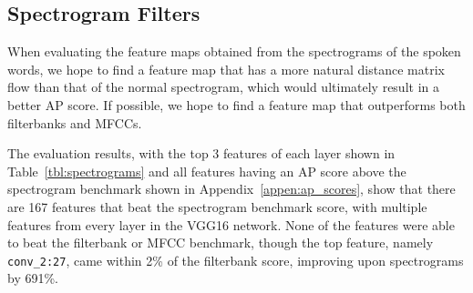 \subsection{Spectrogram Filters}

When evaluating the feature maps obtained from the spectrograms of the spoken words, we hope to find a feature map that has a more natural distance matrix flow than that of the normal spectrogram, which would ultimately result in a better AP score.
If possible, we hope to find a feature map that outperforms both filterbanks and MFCCs.

The evaluation results, with the top 3 features of each layer shown in Table~\ref{tbl:spectrograms} and all features having an AP score above the spectrogram benchmark shown in Appendix~\ref{appen:ap_scores}, show that there are 167 features that beat the spectrogram benchmark score, with multiple features from every layer in the VGG16 network.
None of the features were able to beat the filterbank or MFCC benchmark, though the top feature, namely \texttt{conv\_2:27}, came within 2\% of the filterbank score, improving upon spectrograms by 691\%.

